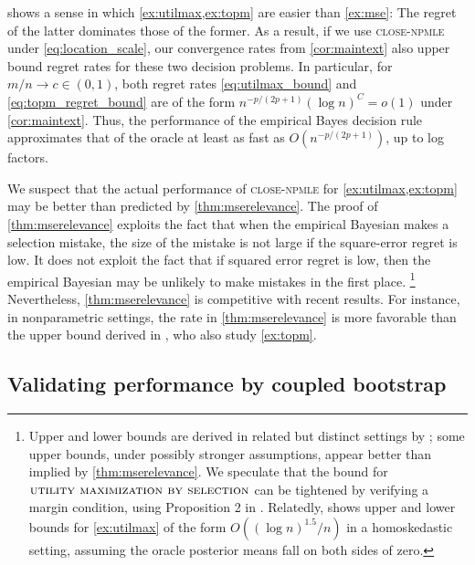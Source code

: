 \documentclass[12pt, reqno]{amsart}
\newcommand{\utilmax}{\textsc{utility maximization by selection}}
\newcommand{\close}{\textsc{close}}
\newcommand{\npmle}{\textsc{npmle}}
\newcommand{\closenpmle}{\close-\npmle}
\numberwithin{equation}{section}
\begin{document}
 shows a sense in which \cref{ex:utilmax,ex:topm} are easier than
\cref{ex:mse}: The regret of the latter dominates those of the former. As a result, if we
 use \closenpmle{} under \eqref{eq:location_scale}, our convergence rates from 
\cref{cor:maintext} also
upper bound regret rates for these two decision problems. In particular, for $m/n \to c
\in (0,1)$, both regret rates
 \eqref{eq:utilmax_bound} and \eqref{eq:topm_regret_bound} are of the form $n^{-p/(2p+1)}
 (\log n)^{C} = o(1)$ under \cref{cor:maintext}. Thus, the performance  of the empirical
 Bayes decision rule approximates that of the oracle at least as fast as
 $O(n^{-p/(2p+1)})$, up to log factors.



\begin{rmksq}

 We suspect that the actual performance of
 \closenpmle{} for \cref{ex:utilmax,ex:topm} may be better than predicted by
 \cref{thm:mserelevance}. The proof of \cref{thm:mserelevance} exploits the fact that when
 the empirical Bayesian makes a selection mistake, the size of the mistake is not large if
 the square-error regret is low. It does not exploit the fact that if squared error regret
 is low, then the empirical Bayesian may be unlikely to make mistakes in the first place.%
 \footnote{Upper and lower bounds are derived in related but distinct settings by
 \citet{audibert2007fast,bonvini2023minimax}; some upper bounds, under possibly stronger
 assumptions, appear better than implied by \cref{thm:mserelevance}. 
We speculate that the bound for $\utilmax$ can be tightened by verifying a margin
 condition, using Proposition 2 in \citet{bonvini2023minimax}.
 Relatedly,
 \citet{liang2000empirical} shows upper and lower bounds for \cref{ex:utilmax} of the form
 $O ((\log n)^{1.5} /n)$ in a homoskedastic setting, assuming the oracle posterior means
 fall on both sides of zero. 
} Nevertheless, \cref{thm:mserelevance} is
 competitive with recent results. For instance, in nonparametric settings, the rate in
 \cref{thm:mserelevance} is more favorable than the upper bound derived in
 \citet{coeyhung}, who also study \cref{ex:topm}.%
\end{rmksq}



\subsection{Validating performance by coupled bootstrap}
\label{sub:coupled_bootstrap}
\end{document}
